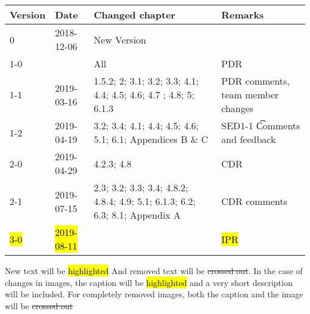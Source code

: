 \begin{longtable}{|p{1.5cm}|p{2cm}|p{6cm}|p{3cm}|}\hline
\centering
\textbf{Version} & \textbf{Date} & \textbf{Changed chapter} & \textbf{Remarks}  \\\hline
0       & 2018-12-06        & New Version                                                                   &                                       \\\hline
1-0     &                   & All                                                                           & PDR                                   \\\hline
1-1     & 2019-03-16        & 1.5.2; 2; 3.1; 3.2; 3.3; 4.1; 4.4; 4.5; 4.6; 4.7 ; 4.8; 5; 6.1.3              & PDR comments, team member changes     \\\hline
1-2     & 2019-04-19        & 3.2; 3.4; 4.1; 4.4; 4.5; 4.6; 5.1; 6.1; Appendices B \& C                     & SED1-1 \t Comments and feedback       \\\hline
2-0     & 2019-04-29        & 4.2.3; 4.8                                                                    & CDR                                   \\\hline
2-1     & 2019-07-15        & 2.3; 3.2; 3.3; 3.4; 4.8.2; 4.8.4; 4.9; 5.1; 6.1.3; 6.2; 6.3; 8.1; Appendix A  & CDR comments                          \\\hline
\hl{3-0}& \hl{2019-08-11}   & \hl{}                                                                         & \hl{IPR}                              \\\hline
\end{longtable}       

New text will be \hl{highlighted} And removed text will be \st{crossed out}. In the case of changes in images, the caption will be \hl{highlighted} and a very short description will be included. For completely removed images, both the caption and the image will be \st{crossed out} 
